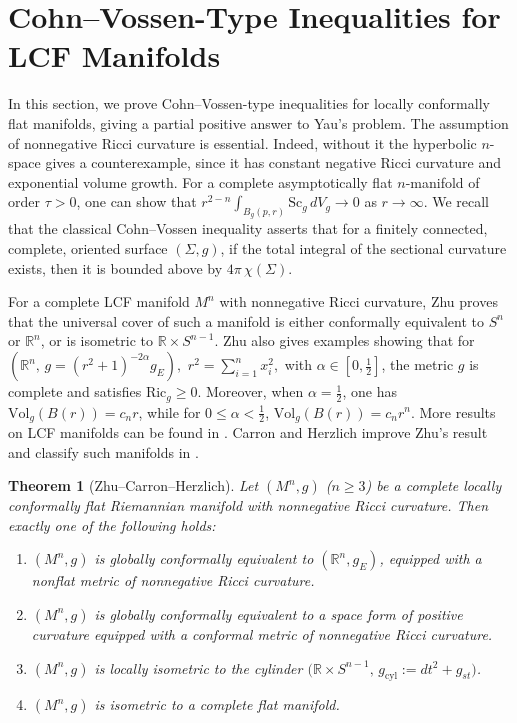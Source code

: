 \documentclass[12pt,oneside,a4paper]{article}
\theoremstyle{mytheorem}
\newtheorem{theorem}[definition]{Theorem}
\theoremstyle{remark}
\begin{document}
\section{Cohn--Vossen-Type Inequalities for LCF Manifolds}\label{LCF case}
 In this section, we prove Cohn--Vossen-type inequalities for locally conformally flat manifolds, giving a partial positive answer to Yau's problem. The assumption of nonnegative Ricci curvature is essential. Indeed, without it the hyperbolic $n$-space gives a counterexample, since it has constant negative Ricci curvature and exponential volume growth. For a complete asymptotically flat \(n\)-manifold of order $ \tau>0$, one can show that $r^{2-n}\int_{B_g(p,r)} \mathrm{Sc}_g\, dV_g \to 0$ as  $r \to \infty $.  We recall that  the classical Cohn--Vossen inequality \cite{zbMATH02533557} asserts that for a finitely connected, complete, oriented surface $(\Sigma,g)$, if the total integral of the sectional curvature exists, then it is bounded above by $ 4\pi\, \chi(\Sigma).$  

For a complete LCF manifold $M^n$ with nonnegative Ricci curvature,  Zhu \cite{zbMATH00537381} proves that the universal cover of such a manifold is either conformally equivalent to \(S^{n}\) or \(\mathbb{R}^{n}\), or is isometric to \(\mathbb{R} \times S^{n-1}\). Zhu also gives examples showing that for 
$(\mathbb{R}^{n},\, g = (r^{2}+1)^{-2\alpha} g_{E}), $
$r^{2} = \sum_{i=1}^{n} x_{i}^{2},$ with \(\alpha \in [0, \frac{1}{2}]\), the metric \(g\) is complete and satisfies \(\mathrm{Ric}_{g} \ge 0\).  
Moreover, when \(\alpha = \tfrac{1}{2}\), one has \(\mathrm{Vol}_{g}(B(r)) = c_{n} r\), while for \(0 \le \alpha < \tfrac{1}{2}\),
\(\mathrm{Vol}_{g}(B(r)) = c_{n} r^{n}\). More results on LCF manifolds can be found in \cite{2025arXiv251213528D}. Carron and Herzlich improve Zhu’s result and classify such manifolds in \cite{zbMATH05042496}.

\begin{theorem}[Zhu--Carron--Herzlich]
Let $(M^n,g)$ ($n\geq 3$) be a complete locally conformally flat Riemannian manifold with nonnegative Ricci curvature. Then exactly one of the
following holds:
\begin{enumerate}
\item $(M^n,g)$ is globally conformally equivalent to $(\mathbb{R}^n,g_E)$, equipped with a
nonflat metric of nonnegative Ricci curvature.
\item $(M^n,g)$ is  globally conformally equivalent to a space form of positive curvature
equipped with a conformal metric of nonnegative Ricci curvature.
\item $(M^n,g)$ is locally isometric to the cylinder $\bigl(\mathbb{R} \times S^{n-1},\, g_{\mathrm{cyl}} := dt^2 + g_{st}\bigr)$.
\item $(M^n,g)$ is isometric to a complete flat manifold.
\end{enumerate}
\end{theorem}
\end{document}
